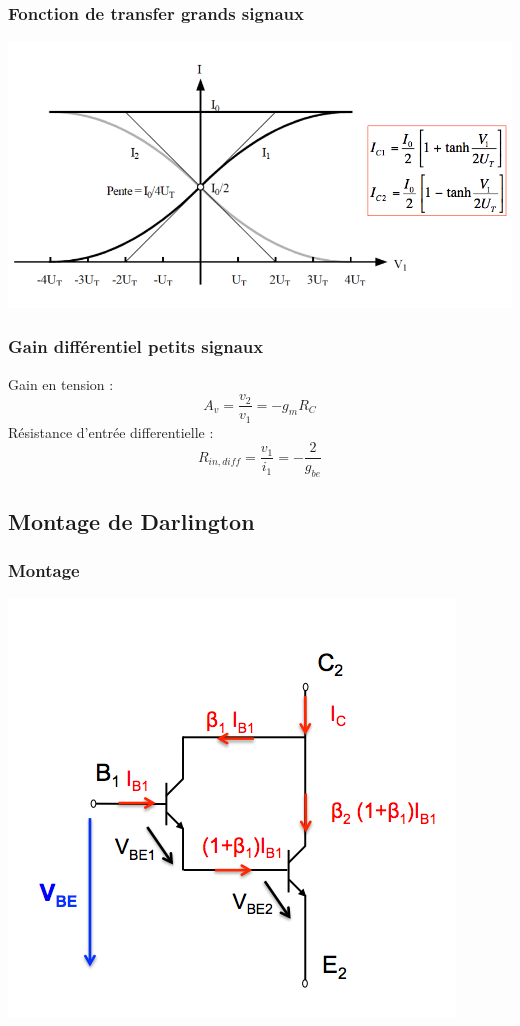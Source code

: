 \documentclass[]{article}
\begin{document}
\subsubsection{Fonction de transfer grands signaux}
\includegraphics[scale=0.8]{transfertgds}

\subsubsection{Gain différentiel petits signaux}
Gain en tension : $$ A_v = \frac{v_2}{v_1} = - g_mR_C $$
Résistance d'entrée differentielle : $$ R_{in,diff} = \frac{v_1}{i_1} = - \frac{2}{g_{be}}$$

\subsection{Montage de Darlington}
\subsubsection{Montage}
\includegraphics[scale=0.7]{darlington}
\end{document}
